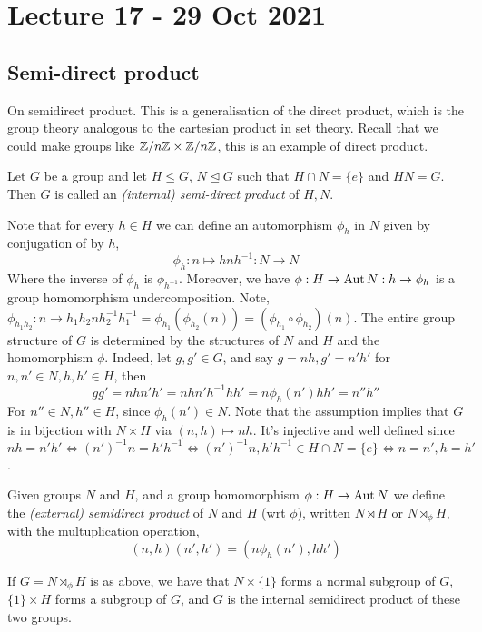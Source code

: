 \section{Lecture 17 - 29 Oct 2021}
\subsection{Semi-direct product}
On semidirect product. This is a generalisation of the direct product, which is the
group theory analogous to the cartesian product in set theory. Recall that we could make
groups like $\mathbb Z/n\mathbb Z \times \mathbb Z/n\mathbb Z$, this is an example of direct product. 
\begin{definition}
  Let $G$ be a group and let $H\leq G$, $N\trianglelefteq G$ such that $H\cap N = \{e\}$
  and $HN=G$. Then $G$ is called an \emph{(internal) semi-direct product} of $H,N$.
  \label{def:intSemidirProd}
\end{definition}
Note that for every $h\in H$ we can define an automorphism $\phi_h$ in $N$ given by
conjugation of by $h$,
\[\phi_h:n\mapsto hnh^{-1}:N\to N\]
Where the inverse of $\phi_h$ is $\phi_{h^{-1}}$. Moreover, we have $\phi:H\to \operatorname{Aut} N:h\to
\phi_h$ is a group homomorphism undercomposition. Note, $\phi_{h_1h_2}:n\to h_1h_2 n
h_2^{-1}h_{1}^{-1} =\phi_{h_1}(\phi_{h_2}(n))= (\phi_{h_1}\circ\phi_{h_2})(n)$. The entire
group structure of $G$ is determined by the structures of $N$ and $H$ and the homomorphism
$\phi$. Indeed, let $g,g'\in G$, and say $g=nh, g'=n'h'$ for $n,n'\in N, h,h'\in H$, then 
\[gg'=nhn'h'=nhn'h^{-1}hh'=n\phi_h(n')hh'=n''h''\]
For $n''\in N, h''\in H$, since $\phi_h(n')\in N$. Note that the assumption implies that
$G$ is in bijection with $N\times H$ via $(n,h)\mapsto nh$. It's injective and well
defined since $nh=n'h' \iff (n')^{-1}n=h'h^{-1} \iff (n')^{-1}n,h'h^{-1}\in H\cap N =
\{e\} \iff n=n',h=h'$.

\begin{definition}
  Given groups $N$ and $H$, and a group homomorphism $\phi:H\to \operatorname{Aut} N$ we define the
  \emph{(external) semidirect product} of $N$ and $H$ (wrt $\phi$), written $N\rtimes H$
  or $N\rtimes_{\phi} H$, with the multuplication operation,
  \[(n,h)(n',h')=(n\phi_h(n'), hh')\]
  \label{def:exSemidirProd}
\end{definition}
If $G=N\rtimes_{\phi} H$ is as above, we have that $N\times \{1\}$ forms a normal subgroup
of $G$, $\{1\}\times H$ forms a subgroup of $G$, and $G$ is the internal semidirect
product of these two groups.

